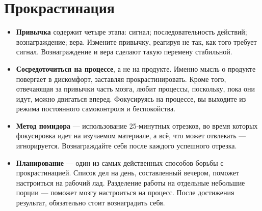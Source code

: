 \documentclass{article}
\begin{document}
\section{Прокрастинация}
\begin{itemize}
\item \textbf{Привычка} содержит четыре этапа: сигнал; последовательность действий; вознаграждение; вера. Измените привычку, реагируя не так, как того требует сигнал. Вознаграждение и вера сделают такую перемену стабильной.
\item \textbf{Сосредоточиться на процессе}, а не на продукте. Именно мысль о продукте повергает в дискомфорт, заставляя прокрастинировать. Кроме того, отвечающая за привычки часть мозга, любит процессы, поскольку, пока они идут, можно двигаться вперед. Фокусируясь на процессе, вы выходите из режима постоянного самоконтроля и беспокойства. 
\item \textbf{Метод помидора} --- использование 25-минутных отрезков, во время которых фокусировка идет на изучаемом материале, а всё, что может отвлекать --- игнорируется. Вознаграждайте себя после каждого успешного отрезка.
\item \textbf{Планирование} --- один из самых действенных способов борьбы с прокрастинацией. Список дел на день, составленный вечером, поможет настроиться на рабочий лад. Разделение работы на отдельные небольшие порции --- поможет мозгу настроиться на процесс. После достижения результат, обязательно стоит вознаградить себя.
\end{itemize}
\end{document}
